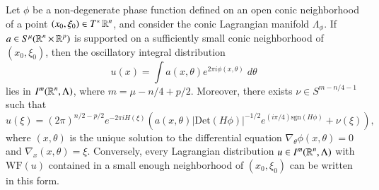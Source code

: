 \begin{theorem}
    Let $\phi$ be a non-degenerate phase function defined on an open conic neighborhood of a point $(x_0,\xi_0) \in T^* \operatorname{\mathbb{R}}^n$, and consider the conic Lagrangian manifold $\Lambda_\phi$. If $a \in S^\mu(\operatorname{\mathbb{R}}^n \times \operatorname{\mathbb{R}}^p)$ is supported on a sufficiently small conic neighborhood of $(x_0,\xi_0)$, then the oscillatory integral distribution
    \[ u(x) = \int a(x,\theta) e^{2 \pi i \phi(x,\theta)}\; d\theta \]
    lies in $I^m(\operatorname{\mathbb{R}}^n, \Lambda)$, where $m = \mu - n/4 + p/2$. Moreover, there exists $\nu \in S^{m-n/4-1}$ such that
    \[ \widehat{u}(\xi) = (2 \pi)^{n/2 - p/2} e^{-2 \pi i H(\xi)} \left( a(x,\theta) |\text{Det}(H \phi)|^{-1/2} e^{(i\pi/4) \text{sgn}(H\phi)} + \nu(\xi) \right), \]
    where $(x,\theta)$ is the unique solution to the differential equation $\nabla_\theta \phi(x,\theta) = 0$ and $\nabla_x(x,\theta) = \xi$. Conversely, every Lagrangian distribution $u \in I^m(\operatorname{\mathbb{R}}^n, \Lambda)$ with $\text{WF}(u)$ contained in a small enough neighborhood of $(x_0,\xi_0)$ can be written in this form.
\end{theorem}

